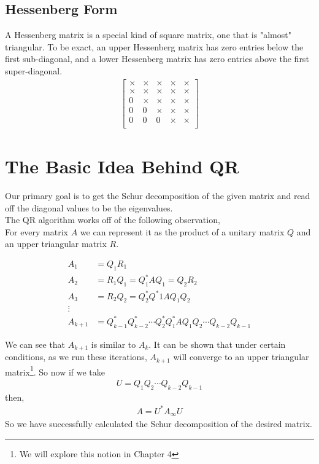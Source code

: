 \subsection{Hessenberg Form}
A Hessenberg matrix is a special kind of square matrix, one that is "almost" triangular. To be exact, an upper Hessenberg matrix has zero entries below the first sub-diagonal, and a lower Hessenberg matrix has zero entries above the first super-diagonal.
\begin{align}
    \begin{bmatrix}
        \times & \times & \times& \times& \times\\
        \times & \times & \times& \times& \times\\
        0 & \times & \times& \times& \times\\
        0 & 0 & \times& \times& \times\\
        0 & 0 & 0& \times& \times\\
    \end{bmatrix}
\end{align}
\section{The Basic Idea Behind QR}
    Our primary goal is to get the Schur decomposition of the given matrix and read off the diagonal values to be the eigenvalues.\\

    The QR algorithm works off of the following observation,\\
    For every matrix $A$ we can represent it as the product of a unitary matrix $Q$ and an upper triangular matrix $R$.

    \begin{align}
        A_1 &= Q_1R_1\\
        A_2 &= R_1Q_1 = Q_1^*AQ_1 = Q_2R_2\\
        A_3 &= R_2Q_2 = Q_2^*Q^*1AQ_1Q_2\\
        \vdots\\
        A_{k+1} &= Q_{k-1}^*Q_{k-2}^*\cdots Q_2^*Q_1^*AQ_1Q_2\cdots Q_{k-2}Q_{k-1}
    \end{align}

    We can see that $A_{k+1}$ is similar to $A_k$. It can be shown that under certain conditions, as we run these iterations, $A_{k+1}$ will converge to an upper triangular matrix\footnote{We will explore this notion in Chapter 4}. So now if we take
    \begin{align}
        U = Q_1Q_2\cdots Q_{k-2}Q_{k-1}
    \end{align}
    then, 
    \begin{align}
        A = U^*A_{\infty}U
    \end{align}
    So we have successfully calculated the Schur decomposition of the desired matrix.

